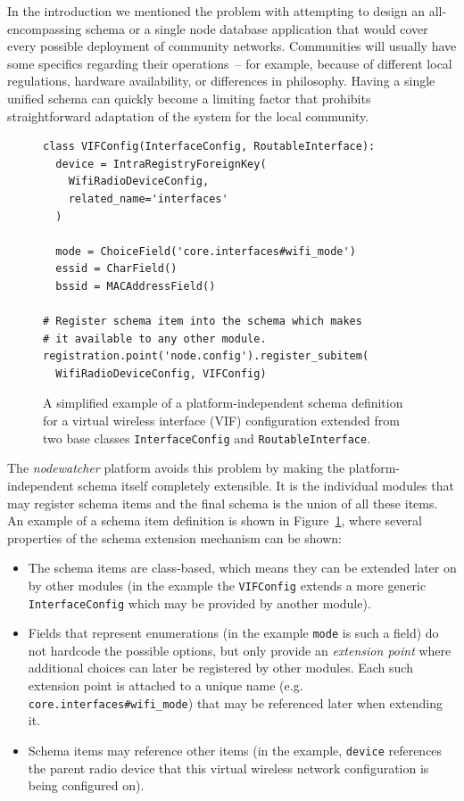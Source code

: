 \documentclass[5p,sort&compress]{elsarticle}
\newcommand{\nodewatcher}{\textit{nodewatcher}}
\begin{document}
In the introduction we mentioned the problem with attempting to design an all-encompassing schema or a single node database application that would cover every possible deployment of community networks.
Communities will usually have some specifics regarding their operations~-- for example, because of different local regulations, hardware availability, or differences in philosophy.
Having a single unified schema can quickly become a limiting factor that prohibits straightforward adaptation of the system for the local community.

\begin{figure}
\centering
\begin{verbatim}
class VIFConfig(InterfaceConfig, RoutableInterface):
  device = IntraRegistryForeignKey(
    WifiRadioDeviceConfig,
    related_name='interfaces'
  )

  mode = ChoiceField('core.interfaces#wifi_mode')
  essid = CharField()
  bssid = MACAddressField()

# Register schema item into the schema which makes
# it available to any other module.
registration.point('node.config').register_subitem(
  WifiRadioDeviceConfig, VIFConfig)
\end{verbatim}
\caption{A simplified example of a platform-independent schema definition for a virtual wireless interface (VIF) configuration extended from two base classes \texttt{InterfaceConfig} and \texttt{RoutableInterface}.}
\label{fig:schema-module-wifi}
\end{figure}

The \nodewatcher{} platform avoids this problem by making the platform-independent schema itself completely extensible.
It is the individual modules that may register schema items and the final schema is the union of all these items.
An example of a schema item definition is shown in Figure~\ref{fig:schema-module-wifi}, where several properties of the schema extension mechanism can be shown:
\begin{itemize}
    \item The schema items are class-based, which means they can be extended later on by other modules (in the example the \texttt{VIFConfig} extends a more generic \texttt{InterfaceConfig} which may be provided by another module).
    \item Fields that represent enumerations (in the example \texttt{mode} is such a field) do not hardcode the possible options, but only provide an \textit{extension point} where additional choices can later be registered by other modules.
    Each such extension point is attached to a unique name (e.g. \texttt{core.interfaces\#wifi\_mode}) that may be referenced later when extending it.
    \item Schema items may reference other items (in the example, \texttt{device} references the parent radio device that this virtual wireless network configuration is being configured on).
\end{itemize}
\end{document}

